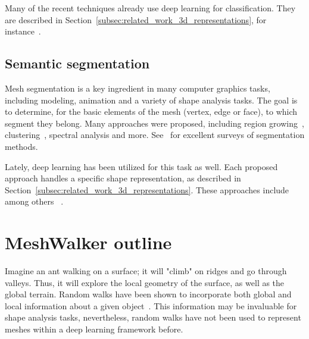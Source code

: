 \documentclass[acmtog]{acmart}
\begin{document}
Many of the recent techniques already use deep learning for classification.
They are described in Section~\ref{subsec:related_work_3d_representations}, for instance~\cite{hanocka2018alignet, qi2017pointnet, qi2017pointnet++, li2018pointcnn, ezuz2017gwcnn, bronstein2011shape, feng2019meshnet, thomas2019kpconv, liu2019relation, velivckovic2017graph, wang2019graph, kipf2016semi, perozzi2014deepwalk}.

\subsection{Semantic segmentation}
\label{subsec:related_work_segmentatio}
Mesh segmentation is a key ingredient in many computer graphics tasks, including modeling, animation and a variety of shape analysis tasks.
The goal is to determine, for the basic elements of the mesh (vertex, edge or face), to which segment they belong.
Many approaches were proposed, including region growing~\cite{chazelle1997strategies, lavoue2005new, zhou2004decomposing, koschan2003perception, sun2002triangle, katz2005mesh},
clustering~\cite{shlafman2002metamorphosis, katz2003hierarchical, gelfand2004shape, attene2006hierarchical}, spectral analysis \cite{alpert1995spectral, gotsman2003graph, liu2004segmentation, zhang2005mesh} and more.
See~\cite{Attene_06,shamir2008survey,rodrigues2018part} for excellent surveys of segmentation methods.

Lately, deep learning has been utilized for this task as well.
Each proposed approach handles a specific shape representation, as described in Section~\ref{subsec:related_work_3d_representations}.
These approaches include among others ~\cite{hanocka2018alignet, qi2017pointnet, qi2017pointnet++, li2018pointcnn, yang2020continuous, haim2019surface, maron2017convolutional, qi2017pointnet++, guo20153d}. 


\section{MeshWalker outline}
\label{sec:outline}

Imagine an ant walking on a surface; it will "climb" on ridges and go through valleys. 
Thus, it will explore the local geometry of the surface, as well as the global terrain. 
Random walks have been shown to incorporate both global and local information about a given object~\cite{Lai:2008:FMS:1364901.1364927,lovasz1993random, grady2006random, noh2004random}. 
This information may be invaluable for shape analysis tasks, nevertheless, random walks have not been used to represent meshes within a deep learning framework before. 
\end{document}
